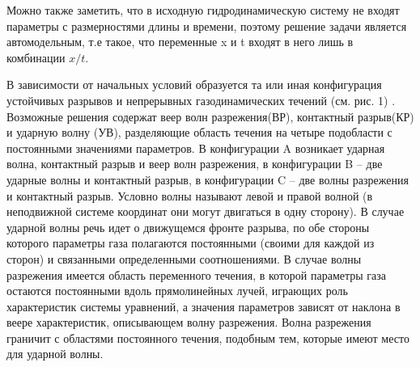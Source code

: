 \documentclass[a4paper,12pt]{extarticle}
\begin{document}
Можно также заметить, что в исходную гидродинамическую систему не входят параметры с размерностями длины и времени, поэтому решение задачи является автомодельным, т.е такое, что переменные x и t входят в него лишь в комбинации \(x/t\).

В зависимости от начальных условий образуется та или иная
конфигурация устойчивых разрывов и непрерывных газодинамических течений (см. рис. 1) . 
Возможные решения содержат веер волн разрежения(ВР), контактный разрыв(КР) и ударную волну (УВ), разделяющие область
течения на четыре подобласти с постоянными значениями параметров. 
В конфигурации A возникает
ударная волна, контактный разрыв и веер волн разрежения, в конфигурации B – две ударные волны и
контактный разрыв, в конфигурации C – две волны разрежения и контактный разрыв. Условно волны
называют левой и правой волной (в неподвижной системе координат они могут двигаться в одну сторону). В случае ударной волны речь идет о движущемся фронте разрыва, по обе стороны которого параметры газа полагаются постоянными (своими для каждой из сторон) и связанными определенными соотношениями. В случае волны разрежения имеется область переменного течения, в которой параметры газа
остаются постоянными вдоль прямолинейных лучей, играющих роль характеристик системы уравнений,
а значения параметров зависят от наклона в веере характеристик, описывающем волну разрежения. Волна разрежения граничит с областями постоянного течения, подобным тем, которые имеют место для
ударной волны. 
\end{document}
